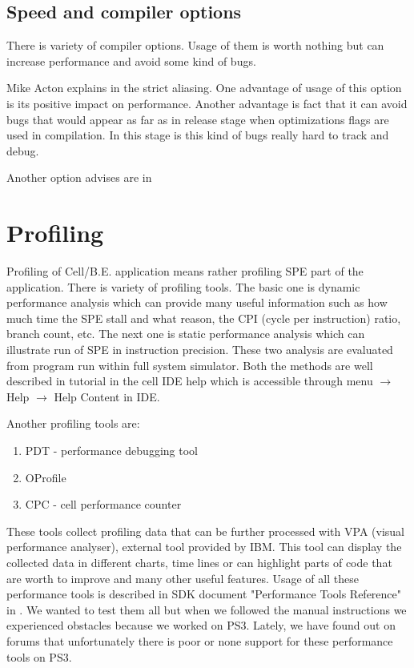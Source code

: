 \subsection {Speed and compiler options}

\par
There is variety of compiler options.
Usage of them is worth nothing but can increase performance and avoid some kind of bugs.

\par
Mike Acton explains in \cite{strictAliasing} the strict aliasing.
One advantage of usage of this option is its positive impact on performance.
Another advantage is fact that it can avoid bugs that would appear as far as in release stage when optimizations flags are used in compilation.
In this stage is this kind of bugs really hard to track and debug.

\par
Another option advises are in \cite{compilerOptions}

\section{Profiling}

\par
Profiling of \mbox{Cell/B.E.} application means rather profiling SPE part of the application.
There is variety of profiling tools.
The basic one is dynamic performance analysis which can provide many useful information such as how much time the SPE stall and what reason, the CPI (cycle per instruction) ratio, branch count, etc.
The next one is static performance analysis which can illustrate run of SPE in instruction precision.
These two analysis are evaluated from program run within full system simulator.
Both the methods are well described in tutorial in the cell IDE help which is accessible through menu $\rightarrow$ Help $\rightarrow$ Help Content in IDE.

\par
Another profiling tools are:
\begin{enumerate}
\item{PDT - performance debugging tool}
\item{OProfile}
\item{CPC - cell performance counter}
\end{enumerate}

These tools collect profiling data that can be further processed with VPA (visual performance analyser), external tool provided by IBM.
This tool can display the collected data in different charts, time lines or can highlight parts of code that are worth to improve and many other useful features.
Usage of all these performance tools is described in SDK document "Performance Tools Reference" in \cite{performanceToolRef}.
We wanted to test them all but when we followed the manual instructions we experienced obstacles because we worked on PS3.
Lately, we have found out on forums that unfortunately there is poor or none support for these performance tools on PS3.
